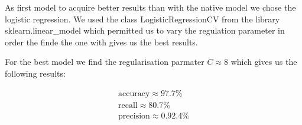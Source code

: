 As first model to acquire better results than with the native model we 
chose the logistic regression. We used the class LogisticRegressionCV 
from the library sklearn.linear_model which permitted us to vary the 
regulation parameter in order the finde the one with gives us the best results.

For the best model we find the regularisation parmater $C \approx 8$ which gives
us the following results:

\begin{align}
    \text{accuracy}\approx 97.7\%\\
    \text{recall}\approx 80.7\%\\
    \text{precision} \approx 0.92.4\%
\end{align}